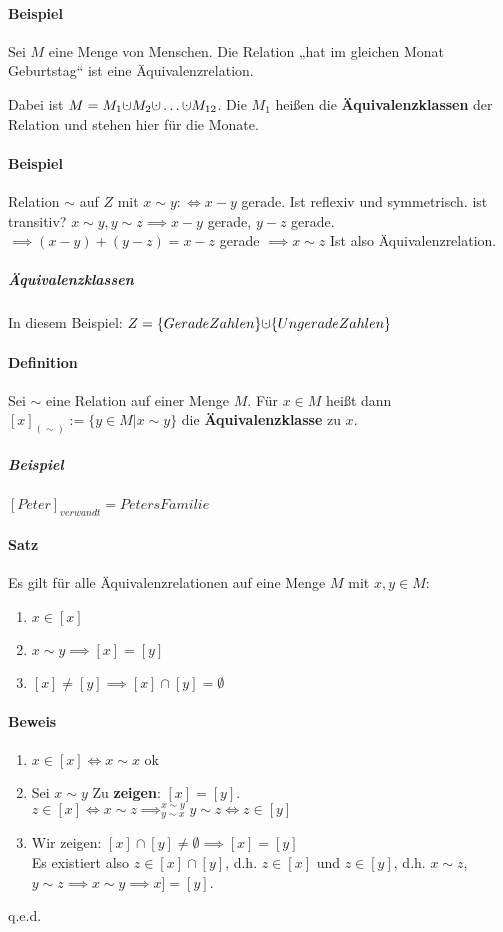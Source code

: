 \documentclass[14pt,a4paper]{article}
\newcommand{\dotcup}{\ensuremath{\mathaccent\cdot\cup}}
\begin{document}
			\paragraph{Beispiel}
				Sei $M$ eine Menge von Menschen. Die Relation „hat im gleichen Monat Geburtstag“ ist eine Äquivalenzrelation.

				Dabei ist $ M = M_1 \dotcup M_2 \dotcup \dots \dotcup M_{12} $. Die $M_1$ heißen die \textbf{Äquivalenzklassen} der Relation und stehen hier für die Monate.

			\paragraph{Beispiel}
				Relation $ \sim $ auf $ Z $ mit $ x \sim y :\Leftrightarrow x-y $ gerade.
				Ist reflexiv und symmetrisch.
				ist transitiv? $ x \sim y, y \sim z \implies x-y$ gerade, $ y-z$ gerade. $\implies (x-y) + (y-z) = x-z$ gerade $\implies x \sim z $
				Ist also Äquivalenzrelation.

				\subparagraph{Äquivalenzklassen}
					In diesem Beispiel: $ Z = \{Gerade Zahlen\} \dotcup \{Ungerade Zahlen\} $


			\paragraph{Definition} Sei $ \sim $ eine Relation auf einer Menge $M$. Für $ x \in M $ heißt dann $ [x]_{(\sim)} := \{ y \in M | x \sim y \}$ die \textbf{Äquivalenzklasse} zu $x$.
				\subparagraph{Beispiel}
					$ [Peter]_{verwandt} = Peters Familie $
			\paragraph{Satz}
				Es gilt für alle Äquivalenzrelationen auf eine Menge $M$ mit $x,y \in M$:
				\begin{enumerate}
					\item $ x \in [x] $
					\item $ x \sim y \implies [x] = [y] $
					\item $ [x] \neq [y] \implies [x] \cap [y] = \emptyset $
				\end{enumerate}
			\paragraph{Beweis}
				\begin{enumerate}
					\item $ x \in [x] \Leftrightarrow x \sim x $ ok
					\item Sei $x \sim y $ Zu \textbf{zeigen}: $ [x] = [y] $. \\
						$ z \in [x] \Leftrightarrow x \sim z \implies^{x \sim y}_{y \sim x} y \sim z \Leftrightarrow z \in [y] $
					\item Wir zeigen: $ [x] \cap [y] \neq \emptyset \implies [x] = [y] $ \\
						Es existiert also $ z \in [x] \cap [y]$, d.h. $ z \in [x] $ und $ z \in [y] $, d.h. $ x \sim z$, $y \sim z \implies x \sim y \implies x] = [y]$.
				\end{enumerate}
				q.e.d.
\end{document}

